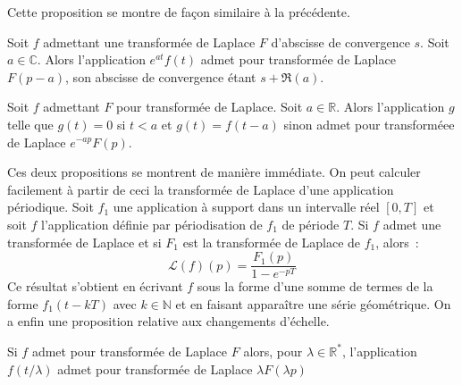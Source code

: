 Cette proposition se montre de façon similaire à la précédente.
\begin{prop}
Soit $f$ admettant une transformée de Laplace $F$ d'abscisse de
convergence $s$. Soit $a \in \mathbb{C}$. Alors l'application
$e^{at}f(t)$ admet pour transformée de Laplace $F(p-a)$, son abscisse
de convergence étant $s + \Re(a)$.
\end{prop}
\begin{prop}
Soit $f$ admettant $F$ pour transformée de Laplace. Soit $a \in
\mathbb{R}$. Alors
l'application $g$ telle que $g(t) = 0$ si $t < a$ et $g(t) = f(t-a)$
sinon admet pour transforméee de Laplace $e^{-ap}F(p)$.
\end{prop}
Ces deux propositions se montrent de manière immédiate.
On peut calculer facilement à partir de ceci la transformée de Laplace
d'une application périodique. Soit $f_1$ une application à support
dans un intervalle réel $[0,T]$ et soit $f$ l'application définie par
périodisation de $f_1$ de période $T$. Si $f$ admet une transformée de
Laplace et si $F_1$ est la transformée de Laplace de $f_1$, alors~:
\[
\mathcal{L}(f)(p) = \frac{F_1(p)}{1-e^{-pT}}
\]
Ce résultat s'obtient en écrivant $f$ sous la forme d'une somme de
termes de la forme $f_1(t-k T)$ avec $k \in \mathbb{N}$ et en faisant
apparaître une série géométrique.
On a enfin une proposition relative aux changements d'échelle.
\begin{prop}
Si $f$ admet pour transformée de Laplace $F$ alors, pour $\lambda \in
\mathbb{R^*}$, l'application $f(t/\lambda)$ admet pour transformée de
Laplace $\lambda F(\lambda p)$
\end{prop}
